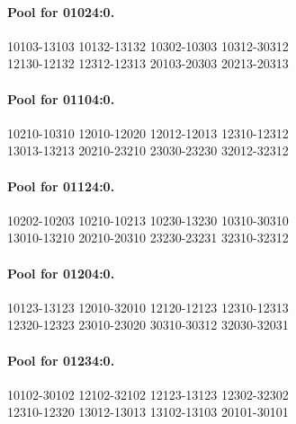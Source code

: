 \documentclass[11pt]{article}
\numberwithin{equation}{section}
\numberwithin{table}{section}
\begin{document}
\paragraph{Pool for 01024:0.}
\begingroup\footnotesize\ttfamily\begin{flushleft}
10103-13103 10132-13132 10302-10303 10312-30312\\
12130-12132 12312-12313 20103-20303 20213-20313\\
\end{flushleft}\endgroup
\paragraph{Pool for 01104:0.}
\begingroup\footnotesize\ttfamily\begin{flushleft}
10210-10310 12010-12020 12012-12013 12310-12312\\
13013-13213 20210-23210 23030-23230 32012-32312\\
\end{flushleft}\endgroup
\paragraph{Pool for 01124:0.}
\begingroup\footnotesize\ttfamily\begin{flushleft}
10202-10203 10210-10213 10230-13230 10310-30310\\
13010-13210 20210-20310 23230-23231 32310-32312\\
\end{flushleft}\endgroup
\paragraph{Pool for 01204:0.}
\begingroup\footnotesize\ttfamily\begin{flushleft}
10123-13123 12010-32010 12120-12123 12310-12313\\
12320-12323 23010-23020 30310-30312 32030-32031\\
\end{flushleft}\endgroup
\paragraph{Pool for 01234:0.}
\begingroup\footnotesize\ttfamily\begin{flushleft}
10102-30102 12102-32102 12123-13123 12302-32302\\
12310-12320 13012-13013 13102-13103 20101-30101\\
\end{flushleft}\endgroup
\end{document}
